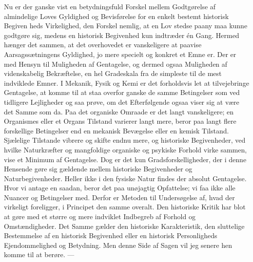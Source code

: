 \documentclass[12pt,a4paper]{article}
\newcommand{\opage}[1]{\marginnote{\footnotesize\textit{[#1]}}}
\begin{document}
Nu er der ganske vist en betydningsfuld Forskel mellem Godtgørelse af
almindelige Loves Gyldighed og Bevisførelse for en enkelt bestemt historisk
Begiven%
\opage{29}heds Virkelighed, den Forskel nemlig, at en Lov stedse paany maa
kunne godtgøre sig, medens en historisk Begivenhed kun indtræder én Gang.
Hermed hænger det sammen, at det overhovedet er vanskeligere at paavise
Aarsagssætningens Gyldighed, jo mere specielt og konkret et Emne er. Der er
med Hensyn til Muligheden af Gentagelse, og dermed ogsaa Muligheden af
videnskabelig Bekræftelse, en hel Gradeskala fra de simpleste til de mest
indviklede Emner. I Mekanik, Fysik og Kemi er det forholdsvis let at
tilvejebringe Gentagelse, at komme til at staa overfor ganske de samme
Betingelser som ved tidligere Lejligheder og saa prøve, om det Efterfølgende
ogsaa viser sig at være det Samme som da. Paa det organiske Omraade er det
langt vanskeligere; en Organismes eller et Organs Tilstand varierer langt
mere, beror paa langt flere forskellige Betingelser end en mekanisk
Bevægelse eller en kemisk Tilstand. Sjælelige Tilstande vibrere og skifte
endnu mere, og historiske Begivenheder, ved hvilke Naturkræfter og
mangfoldige organiske og psykiske Forhold virke sammen, vise et Minimum af
Gentagelse. Dog er det kun Gradsforskelligheder, der i denne Hensende gøre
sig gældende mellem historiske Begivenheder og Naturbegivenheder. Heller
ikke i den fysiske Natur findes der absolut Gentagelse. Hvor vi antage en
saadan, beror det paa unøjagtig Opfattelse; vi faa ikke alle Nuancer og
Betingelser med. Derfor er Metoden til Undersøgelse af, hvad der virkeligt
foreligger, i Principet den samme overalt. Den historiske Kritik har blot at
gøre med et større og mere indviklet Indbegreb af Forhold og Omstændigheder.
Det Samme gælder den historiske Karakteristik, den sluttelige Bestemmelse af
en historisk Begivenhed eller en historisk Personligheds Ejendommelighed og
Betydning. Men denne Side af Sagen vil jeg senere hen komme til at berøre.
---
\end{document}
